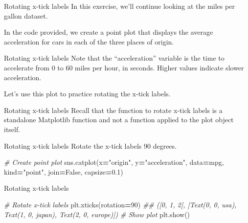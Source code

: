 \documentclass[
  ignorenonframetext,
]{beamer}
\newenvironment{Shaded}{\begin{snugshade}}{\end{snugshade}}
\newcommand{\CommentTok}[1]{\textcolor[rgb]{0.56,0.35,0.01}{\textit{#1}}}
\newcommand{\DecValTok}[1]{\textcolor[rgb]{0.00,0.00,0.81}{#1}}
\newcommand{\FloatTok}[1]{\textcolor[rgb]{0.00,0.00,0.81}{#1}}
\newcommand{\NormalTok}[1]{#1}
\newcommand{\OperatorTok}[1]{\textcolor[rgb]{0.81,0.36,0.00}{\textbf{#1}}}
\newcommand{\StringTok}[1]{\textcolor[rgb]{0.31,0.60,0.02}{#1}}
\newcommand{\VariableTok}[1]{\textcolor[rgb]{0.00,0.00,0.00}{#1}}
\begin{document}
\begin{frame}{Rotating x-tick labels}
\label{rotating-x-tick-labels}
In this exercise, we'll continue looking at the miles per gallon
dataset.

In the code provided, we create a point plot that displays the average
acceleration for cars in each of the three places of origin.
\end{frame}

\begin{frame}{Rotating x-tick labels}
\label{rotating-x-tick-labels-1}
Note that the ``acceleration'' variable is the time to accelerate from 0
to 60 miles per hour, in seconds. Higher values indicate slower
acceleration.

Let's use this plot to practice rotating the x-tick labels.
\end{frame}

\begin{frame}{Rotating x-tick labels}
\label{rotating-x-tick-labels-2}
Recall that the function to rotate x-tick labels is a standalone
Matplotlib function and not a function applied to the plot object
itself.
\end{frame}

\begin{frame}[fragile]{Rotating x-tick labels}
\label{rotating-x-tick-labels-3}
Rotate the x-tick labels 90 degrees.


\begin{Shaded}
\begin{Highlighting}[]

\CommentTok{\# Create point plot}
\NormalTok{sns.catplot(x}\OperatorTok{=}\StringTok{"origin"}\NormalTok{, }
\NormalTok{            y}\OperatorTok{=}\StringTok{"acceleration"}\NormalTok{, }
\NormalTok{            data}\OperatorTok{=}\NormalTok{mpg, }
\NormalTok{            kind}\OperatorTok{=}\StringTok{"point"}\NormalTok{, }
\NormalTok{            join}\OperatorTok{=}\VariableTok{False}\NormalTok{, }
\NormalTok{            capsize}\OperatorTok{=}\FloatTok{0.1}\NormalTok{)}
\end{Highlighting}
\end{Shaded}
\end{frame}

\begin{frame}[fragile]{Rotating x-tick labels}
\label{rotating-x-tick-labels-4}

\begin{Shaded}
\begin{Highlighting}[]
\CommentTok{\# Rotate x{-}tick labels}
\NormalTok{plt.xticks(rotation}\OperatorTok{=}\DecValTok{90}\NormalTok{)}
\CommentTok{\#\# ([0, 1, 2], [Text(0, 0, \textquotesingle{}usa\textquotesingle{}), Text(1, 0, \textquotesingle{}japan\textquotesingle{}), Text(2, 0, \textquotesingle{}europe\textquotesingle{})])}
\CommentTok{\# Show plot}
\NormalTok{plt.show()}
\end{Highlighting}
\end{Shaded}
\end{frame}
\end{document}
